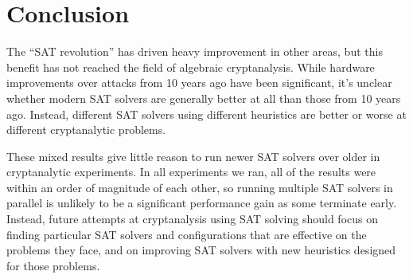 \section{Conclusion}
The ``SAT revolution'' has driven heavy improvement in other areas, but this benefit has not reached the field of algebraic cryptanalysis. While hardware improvements over attacks from 10 years ago have been significant, it's unclear whether modern SAT solvers are generally better at all than those from 10 years ago. Instead, different SAT solvers using different heuristics are better or worse at different cryptanalytic problems.

These mixed results give little reason to run newer SAT solvers over older in cryptanalytic experiments. In all experiments we ran, all of the results were within an order of magnitude of each other, so running multiple SAT solvers in parallel is unlikely to be a significant performance gain as some terminate early. Instead, future attempts at cryptanalysis using SAT solving should focus on finding particular SAT solvers and configurations that are effective on the problems they face, and on improving SAT solvers with new heuristics designed for those problems.
\label{sec:conclusion}